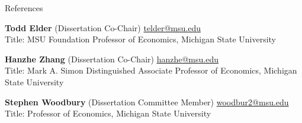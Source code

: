 \documentclass{resume} %
\begin{document}
\begin{rSection}{References}






\textbf{Todd Elder} (Dissertation Co-Chair) \href{mailto:telder@msu.edu}{telder@msu.edu}\\
Title: MSU Foundation Professor of Economics, Michigan State University \\
\vspace{-1em}

\textbf{Hanzhe Zhang} (Dissertation Co-Chair)  \href{mailto:hanzhe@msu.edu}{hanzhe@msu.edu}\\
Title: Mark A. Simon Distinguished Associate Professor of Economics, Michigan State University \\
\vspace{-1em}

\textbf{Stephen Woodbury} (Dissertation Committee Member) \href{mailto:woodbur2@msu.edu}{woodbur2@msu.edu}\\
Title: Professor of Economics, Michigan State University \\


\end{rSection}
\end{document}
